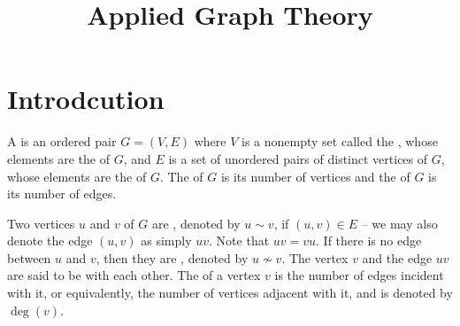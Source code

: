 
\title{\textbf{Applied Graph Theory}}

\date{}
\maketitle

\begingroup
\let\clearpage\relax
\tableofcontents
\endgroup

\clearpage

\renewcommand{\nomname}{List of Symbols}


\printnomenclature[10em]

\clearpage

\section{Introdcution}\label{sec:Intro}
A  is an ordered pair $G = (V, E)$ where $V$ is a nonempty set called the , whose elements are the  of $G$, and $E$ is a set of unordered pairs of distinct vertices of $G$, whose elements are the  of $G$. The  of $G$ is its number of vertices and the  of $G$ is its number of edges.

Two vertices $u$ and $v$ of $G$ are , denoted by $u \sim v$, if $(u,v) \in E$ -- we may also denote the edge $(u,v)$ as simply $uv$. Note that $uv = vu$. If there is no edge between $u$ and $v$, then they are , denoted by $u \nsim v$. The vertex $v$ and the edge $uv$ are said to be  with each other. The  of a vertex $v$ is the number of edges incident with it, or equivalently, the number of vertices adjacent with it, and is denoted by $\deg(v)$.

